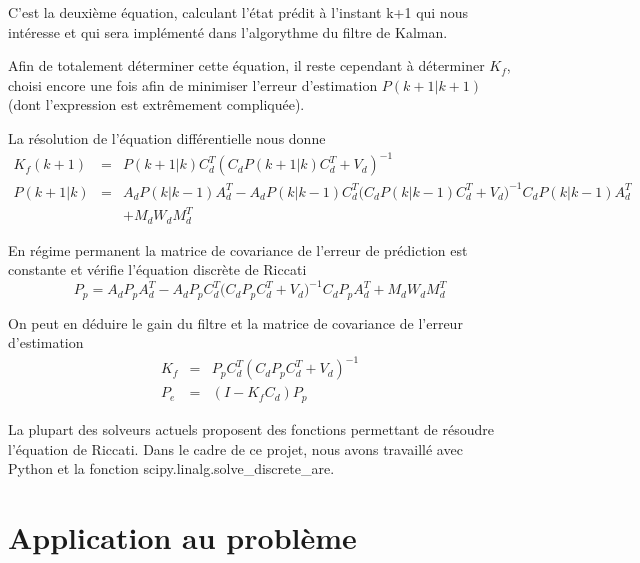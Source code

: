 \documentclass[12pt,twoside,a4paper]{article}
\begin{document}
\noindent C'est la deuxième équation, calculant l'état prédit à l'instant k+1 qui nous intéresse et qui sera implémenté dans l'algorythme du filtre de Kalman. \\

\vspace{1cm} 

Afin de totalement déterminer cette équation, il reste cependant à déterminer $K_{f}$, choisi encore une fois afin de minimiser l'erreur d'estimation $P(k+1|k+1)$ (dont l'expression est extrêmement compliquée).

La résolution de l'équation différentielle nous donne 
$$
\begin{array}{lll}
K_{f}(k+1) &=& P(k+1|k)C_{d}^{T}(C_{d}P(k+1|k)C_{d}^{T}+V_{d})^{-1} \\
P(k+1|k) &=&  A_{d}P(k|k-1)A_{d}^{T} -A_{d}P(k|k-1)C_{d}^{T}\big(C_{d}P(k|k-1)C_{d}^{T}+V_{d}\big)^{-1}C_{d}P(k|k-1)A_{d}^{T} \\
&& + M_{d}W_{d}M_{d}^{T}
\end{array}
$$

En régime permanent la matrice de covariance de l'erreur de prédiction est constante et vérifie l'équation discrète de Riccati
$$ P_{p} =  A_{d}P_{p}A_{d}^{T} -A_{d}P_{p}C_{d}^{T}\big(C_{d}P_{p}C_{d}^{T}+V_{d}\big)^{-1}C_{d}P_{p}A_{d}^{T}  + M_{d}W_{d}M_{d}^{T} $$

\vspace{1cm} 
On peut en déduire le gain du filtre et la matrice de covariance de l'erreur d'estimation 
$$ 
\begin{array}{lll}
K_{f} &=& P_{p}C_{d}^{T}(C_{d}P_{p}C_{d}^{T}+V_{d})^{-1} \\
P_{e} &=& (I-K_{f}C_{d})P_{p}
\end{array}$$



La plupart des solveurs actuels proposent des fonctions permettant de résoudre l'équation de Riccati. 
Dans le cadre de ce projet, nous avons travaillé avec Python et la fonction scipy.linalg.solve\_discrete\_are. \\

\section{Application au problème}
\end{document}
